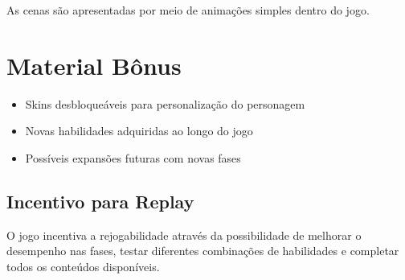 \documentclass[12pt,a4paper]{article}
\begin{document}
As cenas são apresentadas por meio de animações simples dentro do jogo.

\newpage


\section*{Material Bônus}

\begin{itemize}
    \item Skins desbloqueáveis para personalização do personagem
    \item Novas habilidades adquiridas ao longo do jogo
    \item Possíveis expansões futuras com novas fases
\end{itemize}

\subsection*{Incentivo para Replay}

O jogo incentiva a rejogabilidade através da possibilidade de melhorar o desempenho
nas fases, testar diferentes combinações de habilidades e completar todos os conteúdos
disponíveis.
\end{document}

